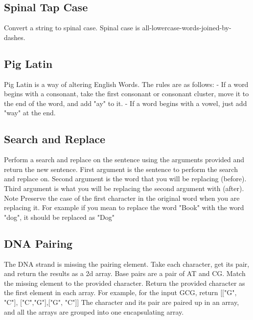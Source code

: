 \documentclass{article}%
\begin{document}
%
\subsection{Spinal Tap Case}%
\label{subsec:SpinalTapCase}%
Convert a string to spinal case. Spinal case is all{-}lowercase{-}words{-}joined{-}by{-}dashes.\newline%

%
\subsection{Pig Latin}%
\label{subsec:PigLatin}%
Pig Latin is a way of altering English Words. The rules are as follows:\newline%
{-} If a word begins with a consonant, take the first consonant or consonant cluster, move it to the end of the word, and add "ay" to it.\newline%
{-} If a word begins with a vowel, just add "way" at the end.\newline%

%
\subsection{Search and Replace}%
\label{subsec:SearchandReplace}%
Perform a search and replace on the sentence using the arguments provided and return the new sentence.\newline%
First argument is the sentence to perform the search and replace on.\newline%
Second argument is the word that you will be replacing (before).\newline%
Third argument is what you will be replacing the second argument with (after).\newline%
Note Preserve the case of the first character in the original word when you are replacing it. For example if you mean to replace the word "Book" with the word "dog", it should be replaced as "Dog"\newline%

%
\subsection{DNA Pairing}%
\label{subsec:DNAPairing}%
The DNA strand is missing the pairing element. Take each character, get its pair, and return the results as a 2d array.\newline%
Base pairs are a pair of AT and CG. Match the missing element to the provided character.\newline%
Return the provided character as the first element in each array.\newline%
For example, for the input GCG, return {[}{[}"G", "C"{]}, {[}"C","G"{]},{[}"G", "C"{]}{]}\newline%
The character and its pair are paired up in an array, and all the arrays are grouped into one encapsulating array.\newline%
\end{document}
